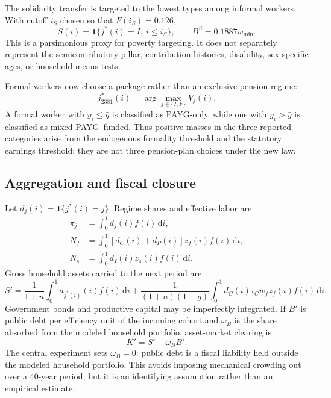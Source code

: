 \documentclass[12pt]{article}
\newcommand{\1}{\mathbf{1}}
\newcommand{\dd}{\,\mathrm{d}}
\begin{document}
The solidarity transfer is targeted to the lowest types among informal workers. With cutoff
$i_S$ chosen so that $F(i_S)=0.126$,
\begin{equation}
S(i)=\1\{j^*(i)=I,\ i\leq i_S\},
\qquad B^S=0.1887w_{\min}.
\label{eq:solidarity}
\end{equation}
This is a parsimonious proxy for poverty targeting. It does not separately represent the
semicontributory pillar, contribution histories, disability, sex-specific ages, or household
means tests.

Formal workers now choose a package rather than an exclusive pension regime:
\begin{equation}
j_{2381}^*(i)=\arg\max_{j\in\{I,F\}}V_j(i).
\label{eq:pillarchoice}
\end{equation}
A formal worker with $y_i\leq\bar y$ is classified as PAYG-only, while one with
$y_i>\bar y$ is classified as mixed PAYG--funded. Thus positive masses in the three reported
categories arise from the endogenous formality threshold and the statutory earnings threshold;
they are not three pension-plan choices under the new law.

\subsection{Aggregation and fiscal closure}

Let $d_j(i)=\1\{j^*(i)=j\}$. Regime shares and effective labor are
\begin{align}
\pi_j&=\int_0^1d_j(i)f(i)\dd i,\\
N_f&=\int_0^1[d_C(i)+d_P(i)]z_f(i)f(i)\dd i,\\
N_s&=\int_0^1d_I(i)z_s(i)f(i)\dd i.
\end{align}
Gross household assets carried to the next period are
\begin{equation}
S'=\frac{1}{1+n}\int_0^1a_{j^*(i)}(i)f(i)\dd i
+\frac{1}{(1+n)(1+g)}
\int_0^1d_C(i)\tau_Cw_fz_f(i)f(i)\dd i.
\end{equation}
Government bonds and productive capital may be imperfectly integrated. If $B'$ is public debt
per efficiency unit of the incoming cohort and $\omega_B$ is the share absorbed from the
modeled household portfolio, asset-market clearing is
\begin{equation}
K'=S'-\omega_B B'.
\label{eq:crowding}
\end{equation}
The central experiment sets $\omega_B=0$: public debt is a fiscal liability held outside the
modeled household portfolio. This avoids imposing mechanical crowding out over a 40-year
period, but it is an identifying assumption rather than an empirical estimate.
\end{document}
